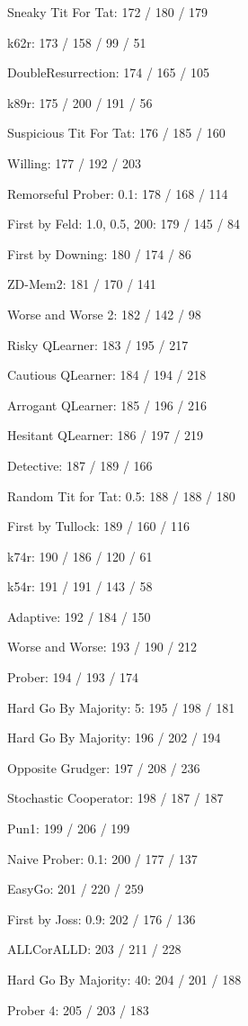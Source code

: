\item Sneaky Tit For Tat: 172 / 180 / 179
\item k62r: 173 / 158 / 99 / 51
\item DoubleResurrection: 174 / 165 / 105
\item k89r: 175 / 200 / 191 / 56
\item Suspicious Tit For Tat: 176 / 185 / 160
\item Willing: 177 / 192 / 203
\item Remorseful Prober: 0.1: 178 / 168 / 114
\item First by Feld: 1.0, 0.5, 200: 179 / 145 / 84
\item First by Downing: 180 / 174 / 86
\item ZD-Mem2: 181 / 170 / 141
\item Worse and Worse 2: 182 / 142 / 98
\item Risky QLearner: 183 / 195 / 217
\item Cautious QLearner: 184 / 194 / 218
\item Arrogant QLearner: 185 / 196 / 216
\item Hesitant QLearner: 186 / 197 / 219
\item Detective: 187 / 189 / 166
\item Random Tit for Tat: 0.5: 188 / 188 / 180
\item First by Tullock: 189 / 160 / 116
\item k74r: 190 / 186 / 120 / 61
\item k54r: 191 / 191 / 143 / 58
\item Adaptive: 192 / 184 / 150
\item Worse and Worse: 193 / 190 / 212
\item Prober: 194 / 193 / 174
\item Hard Go By Majority: 5: 195 / 198 / 181
\item Hard Go By Majority: 196 / 202 / 194
\item Opposite Grudger: 197 / 208 / 236
\item Stochastic Cooperator: 198 / 187 / 187
\item Pun1: 199 / 206 / 199
\item Naive Prober: 0.1: 200 / 177 / 137
\item EasyGo: 201 / 220 / 259
\item First by Joss: 0.9: 202 / 176 / 136
\item ALLCorALLD: 203 / 211 / 228
\item Hard Go By Majority: 40: 204 / 201 / 188
\item Prober 4: 205 / 203 / 183
